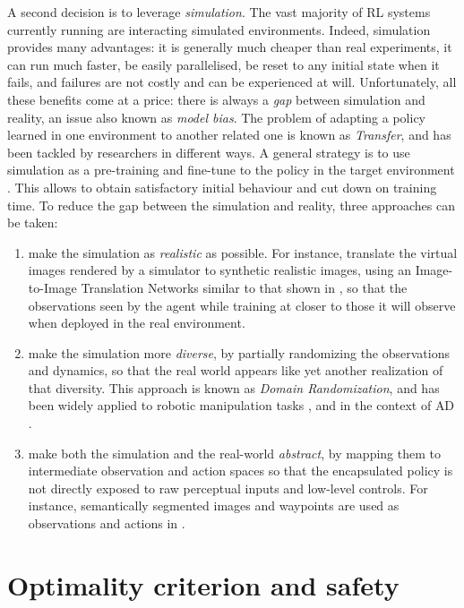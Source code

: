 A second decision is to leverage \emph{simulation}. The vast majority of \acl*{RL} systems currently running are interacting simulated environments. Indeed, simulation provides many advantages: it is generally much cheaper than real experiments, it can run much faster, be easily parallelised, be reset to any initial state when it fails, and failures are not costly and can be experienced at will. Unfortunately, all these benefits come at a price: there is always a \emph{gap} between simulation and reality, an issue also known as \emph{model bias}. The problem of adapting a policy learned in one environment to another related one is known as \emph{Transfer}, and has been tackled by researchers in different ways. A general strategy is to use simulation as a pre-training and fine-tune to the policy in the target environment \citep{Liang2019}. This allows to obtain satisfactory initial behaviour and cut down on training time. To reduce the gap between the simulation and reality, three approaches can be taken:
\begin{enumerate}[label=(\roman*)]
	\item make the simulation as \textit{realistic} as possible. For instance, \citet{Pan2017} translate the virtual images rendered by a simulator to synthetic realistic images, using an Image-to-Image Translation Networks similar to that shown in , so that the observations seen by the agent while training at closer to those it will observe when deployed in the real environment.
	\item make the simulation more \textit{diverse}, by partially randomizing the observations and dynamics, so that the real world appears like yet another realization of that diversity. This approach is known as \emph{Domain Randomization}, and has been widely applied to robotic manipulation tasks \citep{Tobin2017,openai2019solving}, and in the context of \acl*{AD} \citep{Prakash2019,Pouyanfar2019}.
	\item make both the simulation and the real-world \textit{abstract}, by mapping them to intermediate observation and action spaces so that the encapsulated policy is not directly exposed to raw perceptual inputs and low-level controls. For instance, semantically segmented images and waypoints are used as observations and actions in \citep{Mueller2018}.
\end{enumerate}


\section{Optimality criterion and safety}


